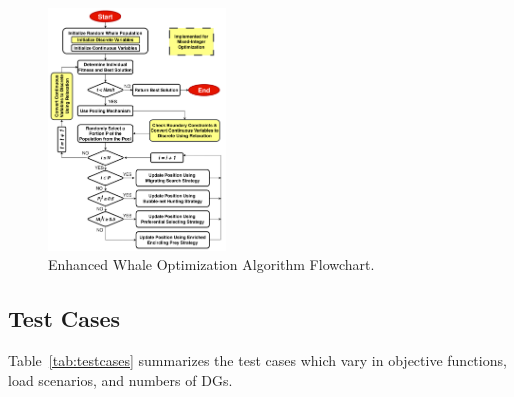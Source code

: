 \documentclass[conference]{IEEEtran}
\begin{document}
\begin{figure}[htbp]
	\centerline{\includegraphics[width=0.42\textwidth]{EWOAflowchart.png}}
	\vspace{-5pt}
	\caption{Enhanced Whale Optimization Algorithm Flowchart.}
	\vspace{-10pt}
	\label{fig:EWOAflowchart}
\end{figure}

\subsection{Test Cases}

Table~\ref{tab:testcases} summarizes the test cases which vary in objective functions, load scenarios, and numbers of DGs.
\end{document}
